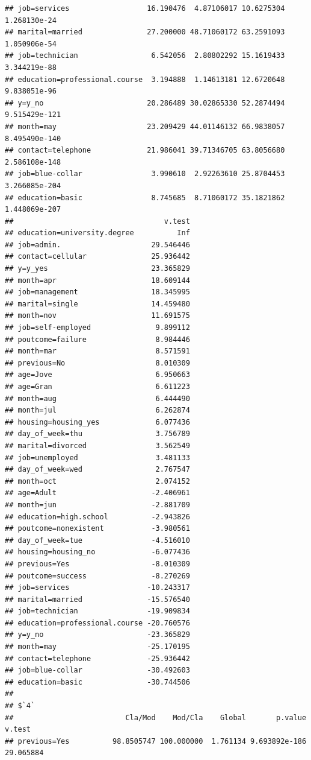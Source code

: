 \documentclass[
]{article}
\begin{document}
\begin{verbatim}
## job=services                  16.190476  4.87106017 10.6275304  1.268130e-24
## marital=married               27.200000 48.71060172 63.2591093  1.050906e-54
## job=technician                 6.542056  2.80802292 15.1619433  3.344219e-88
## education=professional.course  3.194888  1.14613181 12.6720648  9.838051e-96
## y=y_no                        20.286489 30.02865330 52.2874494 9.515429e-121
## month=may                     23.209429 44.01146132 66.9838057 8.495490e-140
## contact=telephone             21.986041 39.71346705 63.8056680 2.586108e-148
## job=blue-collar                3.990610  2.92263610 25.8704453 3.266085e-204
## education=basic                8.745685  8.71060172 35.1821862 1.448069e-207
##                                   v.test
## education=university.degree          Inf
## job=admin.                     29.546446
## contact=cellular               25.936442
## y=y_yes                        23.365829
## month=apr                      18.609144
## job=management                 18.345995
## marital=single                 14.459480
## month=nov                      11.691575
## job=self-employed               9.899112
## poutcome=failure                8.984446
## month=mar                       8.571591
## previous=No                     8.010309
## age=Jove                        6.950663
## age=Gran                        6.611223
## month=aug                       6.444490
## month=jul                       6.262874
## housing=housing_yes             6.077436
## day_of_week=thu                 3.756789
## marital=divorced                3.562549
## job=unemployed                  3.481133
## day_of_week=wed                 2.767547
## month=oct                       2.074152
## age=Adult                      -2.406961
## month=jun                      -2.881709
## education=high.school          -2.943826
## poutcome=nonexistent           -3.980561
## day_of_week=tue                -4.516010
## housing=housing_no             -6.077436
## previous=Yes                   -8.010309
## poutcome=success               -8.270269
## job=services                  -10.243317
## marital=married               -15.576540
## job=technician                -19.909834
## education=professional.course -20.760576
## y=y_no                        -23.365829
## month=may                     -25.170195
## contact=telephone             -25.936442
## job=blue-collar               -30.492603
## education=basic               -30.744506
## 
## $`4`
##                          Cla/Mod    Mod/Cla    Global       p.value     v.test
## previous=Yes          98.8505747 100.000000  1.761134 9.693892e-186  29.065884

\end{verbatim}
\end{document}
